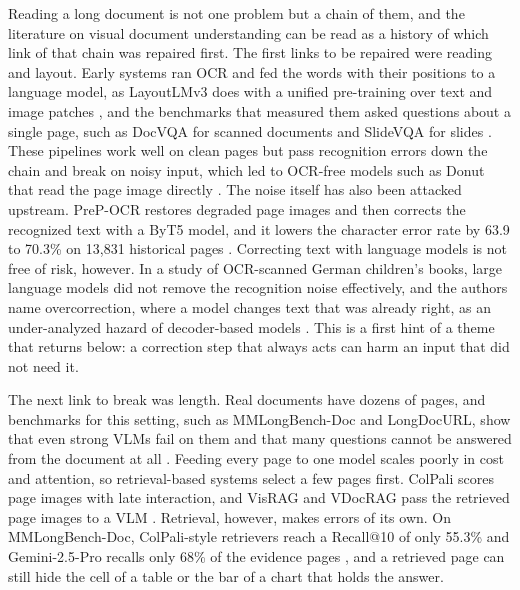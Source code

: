 Reading a long document is not one problem but a chain of them, and the literature on visual document understanding can be read as a history of which link of that chain was repaired first. The first links to be repaired were reading and layout. Early systems ran OCR and fed the words with their positions to a language model, as LayoutLMv3 does with a unified pre-training over text and image patches \cite{huang2022layoutlmv3}, and the benchmarks that measured them asked questions about a single page, such as DocVQA for scanned documents and SlideVQA for slides \cite{mathew2021docvqa,tanaka2023slidevqa}. These pipelines work well on clean pages but pass recognition errors down the chain and break on noisy input, which led to OCR-free models such as Donut that read the page image directly \cite{kim2022donut}. The noise itself has also been attacked upstream. PreP-OCR restores degraded page images and then corrects the recognized text with a ByT5 model, and it lowers the character error rate by 63.9 to 70.3\% on 13,831 historical pages \cite{guan2025preocr}. Correcting text with language models is not free of risk, however. In a study of OCR-scanned German children's books, large language models did not remove the recognition noise effectively, and the authors name overcorrection, where a model changes text that was already right, as an under-analyzed hazard of decoder-based models \cite{nguyen2025gec}. This is a first hint of a theme that returns below: a correction step that always acts can harm an input that did not need it.

The next link to break was length. Real documents have dozens of pages, and benchmarks for this setting, such as MMLongBench-Doc and LongDocURL, show that even strong VLMs fail on them and that many questions cannot be answered from the document at all \cite{ma2024mmlongbench,deng2025longdocurl}. Feeding every page to one model scales poorly in cost and attention, so retrieval-based systems select a few pages first. ColPali scores page images with late interaction, and VisRAG and VDocRAG pass the retrieved page images to a VLM \cite{faysse2024colpali,yu2024visrag,tanaka2025vdocrag}. Retrieval, however, makes errors of its own. On MMLongBench-Doc, ColPali-style retrievers reach a Recall@10 of only 55.3\% and Gemini-2.5-Pro recalls only 68\% of the evidence pages \cite{zhu2025doclens}, and a retrieved page can still hide the cell of a table or the bar of a chart that holds the answer.

